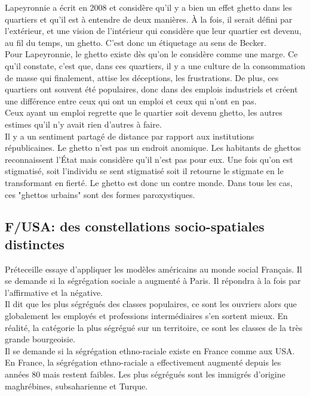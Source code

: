 \documentclass[10pt, a4paper, openany]{book}
\begin{document}
Lapeyronnie a écrit en 2008 et considère qu'il y a bien un effet ghetto dans les quartiers et qu'il est à entendre de deux manières. À la fois, il serait défini par l'extérieur, et une vision de l'intérieur qui considère que leur quartier est devenu, au fil du temps, un ghetto. C'est donc un étiquetage au sens de Becker. \\
Pour Lapeyronnie, le ghetto existe dès qu'on le considère comme une marge. Ce qu'il constate, c'est que, dans ces quartiers, il y a une culture de la consommation de masse qui finalement, attise les déceptions, les frustrations. De plus, ces quartiers ont souvent été populaires, donc dans des emplois industriels et créent une différence entre ceux qui ont un emploi et ceux qui n'ont en pas. \\
Ceux ayant un emploi regrette que le quartier soit devenu ghetto, les autres estimes qu'il n'y avait rien d'autres à faire. \\
Il y a un sentiment partagé de distance par rapport aux institutions républicaines. Le ghetto n'est pas un endroit anomique. Les habitants de ghettos reconnaissent l'État mais considère qu'il n'est pas pour eux. Une fois qu'on est stigmatisé, soit l'individu se sent stigmatisé soit il retourne le stigmate en le transformant en fierté. Le ghetto est donc un contre monde. Dans tous les cas, ces "ghettos urbains" sont des formes paroxystiques. 


\subsection{F/USA: des constellations socio-spatiales distinctes}

Préteceille essaye d'appliquer les modèles américains au monde social Français. Il se demande si la ségrégation sociale a augmenté à Paris. Il répondra à la fois par l'affirmative et la négative. \\
Il dit que les plus ségrégués des classes populaires, ce sont les ouvriers alors que globalement les employés et professions intermédiaires s'en sortent mieux. En réalité, la catégorie la plus ségrégué sur un territoire, ce sont les classes de la très grande bourgeoisie. \\
Il se demande si la ségrégation ethno-raciale existe en France comme aux USA. En France, la ségrégation ethno-raciale a effectivement augmenté depuis les années 80 mais restent faibles. Les plus ségrégués sont les immigrés d'origine maghrébines, subsaharienne et Turque.
\end{document}

